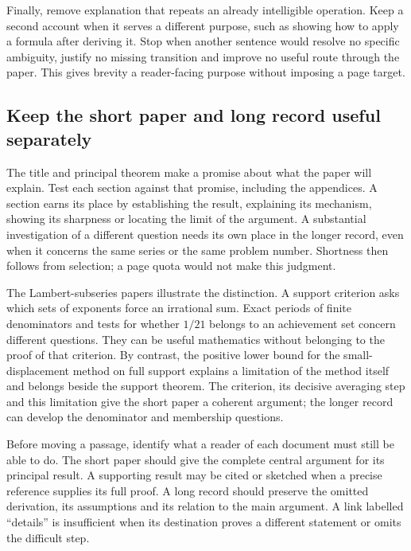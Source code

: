 Finally, remove explanation that repeats an already intelligible operation.
Keep a second account when it serves a different purpose, such as showing how
to apply a formula after deriving it. Stop when another sentence would resolve
no specific ambiguity, justify no missing transition and improve no useful
route through the paper. This gives brevity a reader-facing purpose without
imposing a page target.

\subsection{Keep the short paper and long record useful separately}\label{sec:short-long}

The title and principal theorem make a promise about what the paper will
explain. Test each section against that promise, including the appendices.
A section earns its place by establishing the result, explaining its mechanism,
showing its sharpness or locating the limit of the argument. A substantial
investigation of a different question needs its own place in the longer record,
even when it concerns the same series or the same problem number. Shortness
then follows from selection; a page quota would not make this judgment.

The Lambert-subseries papers illustrate the distinction. A support criterion
asks which sets of exponents force an irrational sum. Exact periods of finite
denominators and tests for whether $1/21$ belongs to an achievement set concern
different questions. They can be useful mathematics without belonging to the
proof of that criterion. By contrast, the positive lower bound for the
small-displacement method on full support explains a limitation of the method
itself and belongs beside the support theorem. The criterion, its decisive
averaging step and this limitation give the short paper a coherent argument;
the longer record can develop the denominator and membership questions.

Before moving a passage, identify what a reader of each document must still be
able to do. The short paper should give the complete central argument for its
principal result. A supporting result may be cited or sketched when a precise
reference supplies its full proof. A long record should preserve the omitted derivation, its assumptions
and its relation to the main argument. A link labelled ``details'' is insufficient
when its destination proves a different statement or omits the difficult step.

